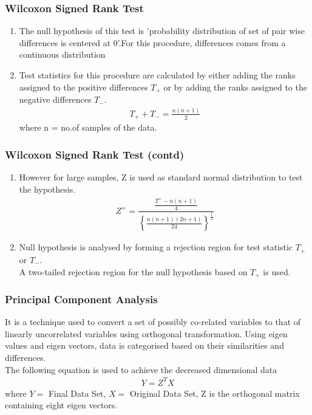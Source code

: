 \documentclass{beamer}
\begin{document}
\begin{frame}[fragile]
\frametitle{Wilcoxon Signed Rank Test}

\begin{block}{}
   \begin{enumerate}
    \item The null hypothesis of this test is 'probability distribution of set of pair wise differences is centered at 0'.For this procedure, differences comes from a continuous distribution  
    \item Test statistics for this procedure are calculated by either adding the ranks assigned to the positive differences \(T_{+}\) or by adding the ranks assigned to the negative differences \(T_{-}\).
    \begin{align}
        T_{+} + T_{-} = \frac{n(n+1)}{2}
    \end{align}
    where n = no.of samples of the data.
\end{enumerate}
\end{block}
    
\end{frame}

\begin{frame}[fragile]
\frametitle{Wilcoxon Signed Rank Test (contd)}
\begin{block}{}
   \begin{enumerate}
    \item However for large samples, Z is used as standard normal distribution to test the hypothesis.
    \begin{align}
        Z^{+}= \dfrac{\frac{T^{+}-n(n+1)}{4}}{\left\{\frac{n(n+1)(2n+1)}{24}\right\}^{\frac{1}{2}}}
    \end{align}
    \item  Null hypothesis is analysed by forming a rejection region for test statistic \(T_{+}\) or \(T_{-}\). 
    \\A two-tailed rejection region for the null
    hypothesis based on \(T_{+}\) is used.
\end{enumerate}
\end{block}
\end{frame}

\begin{frame}[fragile]
\frametitle{Principal Component Analysis}
\begin{block}{}
   It is a technique used to convert a set of possibly co-related variables to that of linearly uncorrelated variables using orthogonal transformation. Using eigen values and eigen vectors, data is categorised based on their similarities and differences.\\
The following equation is used to achieve the decreased dimensional data
\begin{align}
    Y = Z^T X
\end{align}
where $Y = $ Final Data Set, $X=$ Original Data Set, Z is the orthogonal matrix containing eight eigen vectors.
\end{block}
\end{frame}
\end{document}
